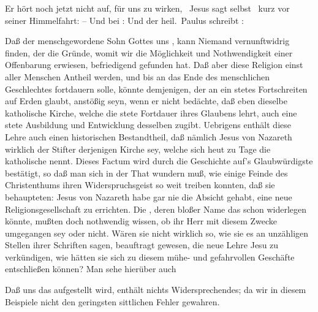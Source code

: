 \begin{aufza}
\item Er hört noch jetzt nicht auf, für uns zu wirken, \usw\ Jesus sagt selbst \ kurz vor seiner Himmelfahrt:  -- Und bei :  Und der heil.\ Paulus schreibt : ~
\end{aufza}

\begin{aufza}
\item Daß der menschgewordene Sohn Gottes uns , kann Niemand vernunftwidrig finden, der die Gründe, womit wir die Möglichkeit und Nothwendigkeit einer Offenbarung erwiesen, befriedigend gefunden hat. Daß aber diese Religion einst aller Menschen Antheil werden, und bis an das Ende des menschlichen Geschlechtes fortdauern solle, könnte demjenigen, der an ein stetes Fortschreiten auf Erden glaubt, anstößig seyn, wenn er nicht bedächte, daß eben dieselbe katholische Kirche, welche die stete Fortdauer ihres Glaubens lehrt, auch eine stete Ausbildung und Entwicklung desselben zugibt. Uebrigens enthält diese Lehre auch einen historischen Bestandtheil, daß nämlich Jesus von Nazareth wirklich der Stifter derjenigen Kirche sey, welche sich heut zu Tage die katholische nennt. Dieses Factum wird durch die Geschichte auf's Glaubwürdigste bestätigt, so daß man sich in der That wundern muß, wie einige Feinde des Christenthums ihren Widerspruchsgeist so weit treiben konnten, daß sie behaupteten: Jesus von Nazareth habe gar nie die Absicht gehabt, eine neue Religionsgesellschaft zu errichten. Die , deren bloßer Name das schon widerlegen könnte, mußten doch nothwendig wissen, ob ihr Herr mit diesem Zwecke umgegangen sey oder nicht. Wären sie nicht wirklich so, wie sie es an unzähligen Stellen ihrer Schriften sagen, beauftragt gewesen, die neue Lehre Jesu zu verkündigen, wie hätten sie sich zu diesem mühe- und gefahrvollen Geschäfte entschließen können? Man sehe hierüber auch \ \  \uam\ 
\item Daß uns das  aufgestellt wird, enthält nichts Widersprechendes; da wir in diesem Beispiele nicht den geringsten sittlichen Fehler gewahren.

\end{aufza}
